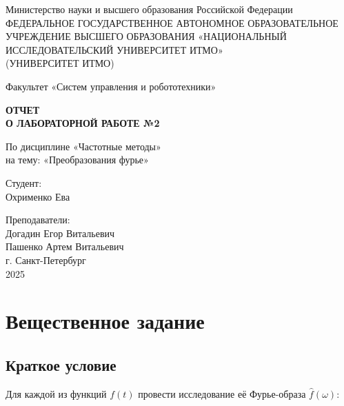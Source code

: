 \documentclass[a4paper,12pt]{article}
\begin{document}
\begin{titlepage}
    \centering
    \vspace*{1cm}

    {\large Министерство науки и высшего образования Российской Федерации}\\
    {\large ФЕДЕРАЛЬНОЕ ГОСУДАРСТВЕННОЕ АВТОНОМНОЕ ОБРАЗОВАТЕЛЬНОЕ УЧРЕЖДЕНИЕ ВЫСШЕГО ОБРАЗОВАНИЯ «НАЦИОНАЛЬНЫЙ ИССЛЕДОВАТЕЛЬСКИЙ УНИВЕРСИТЕТ ИТМО»}\\
    {\large (УНИВЕРСИТЕТ ИТМО)}\\

    \vspace{2cm}

    {\large Факультет «Систем управления и робототехники»}\\

    \vspace{3cm}

    \textbf{{\Huge ОТЧЕТ}\\
    {\Huge О ЛАБОРАТОРНОЙ РАБОТЕ №2}}\\

    \vspace{1cm}

    {\LARGE По дисциплине «Частотные методы»}\\
    {\LARGE на тему: «Преобразования фурье»}\\

    \vspace{3cm}

    {\Large Студент:}\\
    Охрименко Ева

    \vspace{2cm}

    {\Large Преподаватели:}\\
    Догадин Егор Витальевич\\
    Пашенко Артем Витальевич\\

    \vspace{3cm}
    {\large г. Санкт-Петербург}\\
    {\large 2025}

\end{titlepage}
\newpage
\tableofcontents
\newpage


\section{Вещественное задание}
\subsection{Краткое условие}
Для каждой из функций \( f(t) \) провести исследование её Фурье-образа \(\hat{f}(\omega)\):
\end{document}

